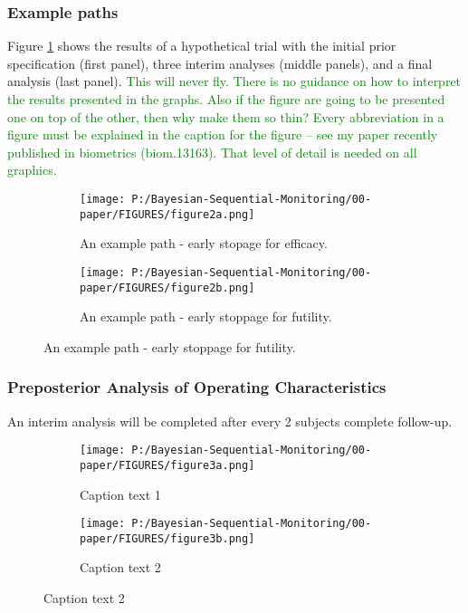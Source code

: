 \documentclass[12pt]{article}
\begin{document}
\subsubsection{Example paths}
Figure \ref{fig:figure2a} shows the results of a hypothetical trial with the initial prior specification (first panel), three interim analyses (middle panels), and a final analysis (last panel).
\textcolor{green}{This will never fly. There is no guidance on how to interpret the results presented in the graphs. Also
if the figure are going to be presented one on top of the other, then why make them so thin? Every abbreviation in a 
figure must be explained in the caption for the figure -- see my paper recently published in biometrics (biom.13163). That level of detail is needed on all graphics.}
\begin{figure}
  \begin{subfigure}{7in}
    \centering\texttt{[image: P:/Bayesian-Sequential-Monitoring/00-paper/FIGURES/figure2a.png]}
    \caption{An example path - early stopage for efficacy.}
	\label{fig:figure2a}
  \end{subfigure}
  \begin{subfigure}{7in}
    \centering\texttt{[image: P:/Bayesian-Sequential-Monitoring/00-paper/FIGURES/figure2b.png]}
    \caption{An example path - early stoppage for futility.}
	\label{fig:figure2b}
  \end{subfigure}
 
\end{figure}
\newpage
\subsubsection{Preposterior Analysis of Operating Characteristics}
An interim analysis will be completed after every 2 subjects complete follow-up.
\begin{figure}
  \begin{subfigure}{7in}
    \centering\texttt{[image: P:/Bayesian-Sequential-Monitoring/00-paper/FIGURES/figure3a.png]}
    \caption{Caption text 1}
  \end{subfigure}
  \begin{subfigure}{7in}
    \centering\texttt{[image: P:/Bayesian-Sequential-Monitoring/00-paper/FIGURES/figure3b.png]}
    \caption{Caption text 2}
  \end{subfigure}
 
\end{figure}
\end{document}
